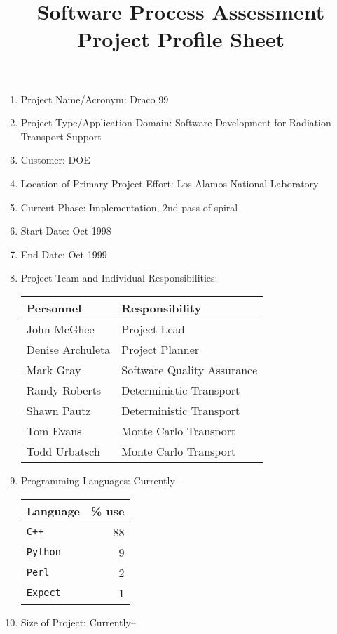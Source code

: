 \title{Software Process Assessment\\ Project Profile Sheet}
\pagestyle{myheadings}

\maketitle
\begin{enumerate}
\item Project Name/Acronym: Draco 99
\item Project Type/Application Domain: Software Development for
Radiation Transport Support 
\item Customer: DOE
\item Location of Primary Project Effort: Los Alamos National
Laboratory
\item Current Phase: Implementation, 2nd pass of spiral
\item Start Date: Oct 1998
\item End Date: Oct 1999
\item Project Team and Individual Responsibilities:
\begin{center}
\begin{tabular}{l|l}
Personnel & Responsibility \\ \hline
John McGhee & Project Lead \\
Denise Archuleta & Project Planner \\
Mark Gray & Software Quality Assurance \\
Randy Roberts & Deterministic Transport \\
Shawn Pautz & Deterministic Transport \\
Tom Evans & Monte Carlo Transport \\
Todd Urbatsch & Monte Carlo Transport \\
\end{tabular}
\end{center}
\item Programming Languages: Currently--
\begin{center}
\begin{tabular}{l|r}
Language & \% use \\ \hline
{\tt C++} & 88 \\
{\tt Python} & 9 \\
{\tt Perl} & 2 \\
{\tt Expect} & 1
\end{tabular}
\end{center}
\item Size of Project: Currently--

\end{enumerate}
